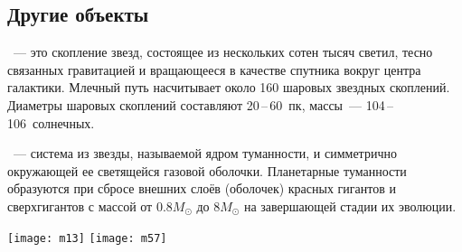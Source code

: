 \subsection{Другие объекты}
\begin{minipage}{0.6\tw}
~--- это скопление звезд, состоящее из нескольких сотен тысяч светил, тесно связанных гравитацией и вращающееся в качестве спутника вокруг центра галактики. Млечный путь насчитывает около 160 шаровых звездных скоплений. Диаметры шаровых скоплений составляют 20\,--\,60~пк, массы~--- 104\,--\,106~солнечных.

~--- система из звезды, называемой ядром туманности, и симметрично окружающей ее светящейся газовой оболочки. Планетарные туманности образуются при сбросе внешних слоёв (оболочек) красных гигантов и сверхгигантов с массой от $0.8M_\odot$ до $8M_\odot$ на завершающей стадии их эволюции.
\end{minipage}
\hfill
\begin{minipage}{0.35\tw}
	\centering
	\vspace{-0.5pc}
	\texttt{[image: m13]}
	\vspace{1pc}
	\texttt{[image: m57]}
\end{minipage}